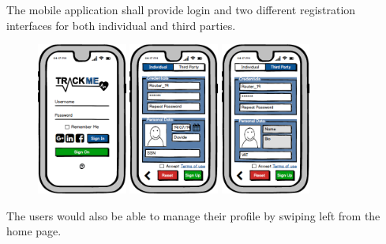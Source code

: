 \documentclass[a4paper]{article}
\begin{document}
        The mobile application shall provide login and two different registration interfaces for both individual and third parties.
        
        \begin{figure}[!htpb]
    	\centering
    	\includegraphics[height=50mm]{images/mockups/Login_Registration.png}
    	\includegraphics[height=50mm]{images/mockups/RegistrationForm.png}
    	\includegraphics[height=50mm]{images/mockups/ThirdPartyRegistration.png}
        \end{figure}
        
        The users would also be able to manage their profile by swiping left from the home page.
        
\end{document}
